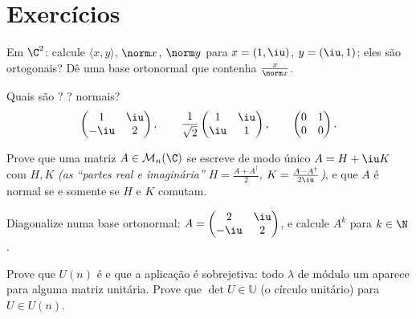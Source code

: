 \section{Exercícios}

\begin{exercise}[$\star$]\label{exo:b2:hermitian:1}
Em $\C^2$: calcule $\langle x, y\rangle$, $\norm x$, $\norm y$ para
$x = (1, \iu)$, $y = (\iu, 1)$; eles são ortogonais? Dê uma
base ortonormal que contenha $\frac{x}{\norm x}$.
\end{exercise}

\begin{exercise}[$\star$]\label{exo:b2:hermitian:2}
Quais são ? ? normais?
\[
\begin{pmatrix} 1 & \iu\\ -\iu & 2 \end{pmatrix},
\qquad
\frac{1}{\sqrt2}\begin{pmatrix} 1 & \iu\\ \iu & 1\end{pmatrix},
\qquad
\begin{pmatrix} 0 & 1\\ 0 & 0 \end{pmatrix}.
\]
\end{exercise}

\begin{exercise}[$\star$]\label{exo:b2:hermitian:3}
Prove que uma matriz $A \in \mathcal{M}_n(\C)$ se escreve de modo único $A =
H + \iu K$ com $H, K$  \emph{(as ``partes real e
imaginária'' $H = \frac{A + A^\dagger}{2}$, $K = \frac{A -
A^\dagger}{2\iu}$)}, e que $A$ é normal se e somente se $H$ e $K$
comutam.
\end{exercise}

\begin{exercise}[$\star\star$]\label{exo:b2:hermitian:4}
Diagonalize numa base ortonormal: $A = \begin{pmatrix} 2 & \iu\\
-\iu & 2\end{pmatrix}$, e calcule $A^k$ para $k \in \N$.
\end{exercise}

\begin{exercise}[$\star\star$]\label{exo:b2:hermitian:5}
Prove que $U(n)$ é  e que a aplicação  é
sobrejetiva: todo $\lambda$ de módulo um aparece para alguma matriz unitária.
Prove que $\det U \in \mathbb{U}$ (o círculo unitário) para $U \in
U(n)$.
\end{exercise}

